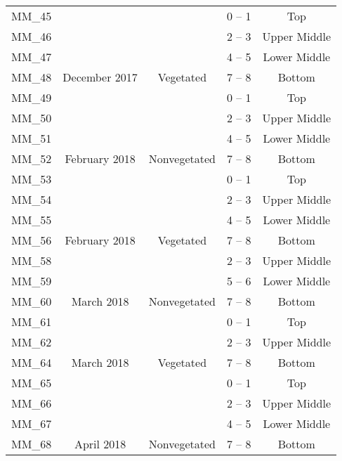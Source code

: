 \documentclass[
  12 pt,
]{article}
\begin{document}
\begin{singlespace}
\begin{longtable}[t]{ccccc}
MM\_45 &  &  & 0 – 1 & Top\\
\nopagebreak
MM\_46 &  &  & 2 – 3 & Upper Middle\\
\nopagebreak
MM\_47 &  &  & 4 – 5 & Lower Middle\\
\nopagebreak
MM\_48 & \multirow{-4}{*}{\centering\arraybackslash 13 December 2017} & \multirow{-4}{*}{\centering\arraybackslash Vegetated} & 7 – 8 & Bottom\\
\cmidrule{1-5}\pagebreak[0]
MM\_49 &  &  & 0 – 1 & Top\\
\nopagebreak
MM\_50 &  &  & 2 – 3 & Upper Middle\\
\nopagebreak
MM\_51 &  &  & 4 – 5 & Lower Middle\\
\nopagebreak
MM\_52 & \multirow{-4}{*}{\centering\arraybackslash 12 February 2018} & \multirow{-4}{*}{\centering\arraybackslash Nonvegetated} & 7 – 8 & Bottom\\
\cmidrule{1-5}\pagebreak[0]
MM\_53 &  &  & 0 – 1 & Top\\
\nopagebreak
MM\_54 &  &  & 2 – 3 & Upper Middle\\
\nopagebreak
MM\_55 &  &  & 4 – 5 & Lower Middle\\
\nopagebreak
MM\_56 & \multirow{-4}{*}{\centering\arraybackslash 12 February 2018} & \multirow{-4}{*}{\centering\arraybackslash Vegetated} & 7 – 8 & Bottom\\
\cmidrule{1-5}\pagebreak[0]
MM\_58 &  &  & 2 – 3 & Upper Middle\\
\nopagebreak
MM\_59 &  &  & 5 – 6 & Lower Middle\\
\nopagebreak
MM\_60 & \multirow{-3}{*}{\centering\arraybackslash 26 March 2018} & \multirow{-3}{*}{\centering\arraybackslash Nonvegetated} & 7 – 8 & Bottom\\
\cmidrule{1-5}\pagebreak[0]
MM\_61 &  &  & 0 – 1 & Top\\
\nopagebreak
MM\_62 &  &  & 2 – 3 & Upper Middle\\
\nopagebreak
MM\_64 & \multirow{-3}{*}{\centering\arraybackslash 26 March 2018} & \multirow{-3}{*}{\centering\arraybackslash Vegetated} & 7 – 8 & Bottom\\
\cmidrule{1-5}\pagebreak[0]
MM\_65 &  &  & 0 – 1 & Top\\
\nopagebreak
MM\_66 &  &  & 2 – 3 & Upper Middle\\
\nopagebreak
MM\_67 &  &  & 4 – 5 & Lower Middle\\
\nopagebreak
MM\_68 & \multirow{-4}{*}{\centering\arraybackslash 23 April 2018} & \multirow{-4}{*}{\centering\arraybackslash Nonvegetated} & 7 – 8 & Bottom\\

\end{longtable}
\end{singlespace}
\end{document}
